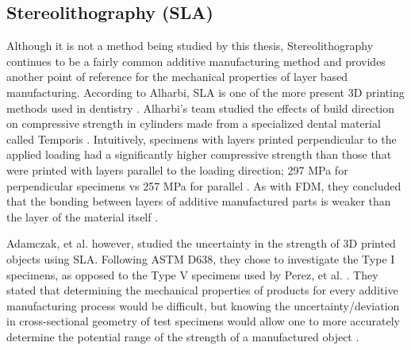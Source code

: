 \subsection{Stereolithography (SLA)}
	Although it is not a method being studied by this thesis, Stereolithography continues to be a fairly common additive manufacturing method and provides another point of reference for the mechanical properties of layer based manufacturing. According to Alharbi, SLA is one of the more present 3D printing methods used in dentistry \citep{Alharbi2016}. Alharbi's team studied the effects of build direction on compressive strength in cylinders made from a specialized dental material called Temporis \citep{Alharbi2016}. Intuitively, specimens with layers printed perpendicular to the applied loading had a significantly higher compressive strength than those that were printed with layers parallel to the loading direction; 297 MPa for perpendicular specimens vs 257 MPa for parallel \citep{Alharbi2016}. As with FDM, they concluded that the bonding between layers of additive manufactured parts is weaker than the layer of the material itself \citep{Alharbi2016}.\par
	Adamczak, et al. however, studied the uncertainty in the strength of 3D printed objects using SLA. Following ASTM D638, they chose to investigate the Type I specimens, as opposed to the Type V specimens used by Perez, et al. \citep{Adamczak2014, TorradoPerez2014}. They stated that determining the mechanical properties of products for every additive manufacturing process would be difficult, but knowing the uncertainty/deviation in cross-sectional geometry of test specimens would allow one to more accurately determine the potential range of the strength of a manufactured object \citep{Adamczak2014}. \par

